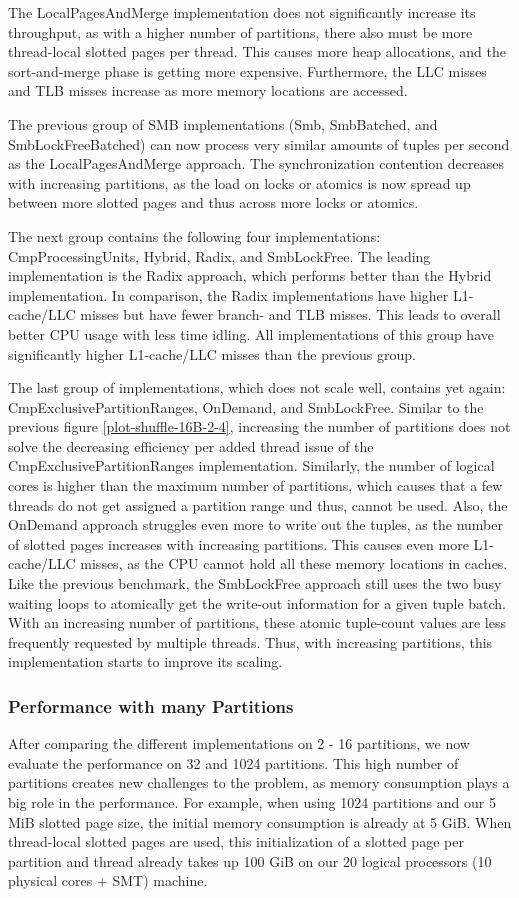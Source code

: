 The LocalPagesAndMerge implementation does not significantly increase its throughput, as with a higher number of partitions, there also must be more thread-local slotted pages per thread.
This causes more heap allocations, and the sort-and-merge phase is getting more expensive.
Furthermore, the \ac{LLC} misses and \ac{TLB} misses increase as more memory locations are accessed.

The previous group of SMB implementations (Smb, SmbBatched, and SmbLockFreeBatched) can now process very similar amounts of tuples per second as the LocalPagesAndMerge approach.
The synchronization contention decreases with increasing partitions, as the load on locks or atomics is now spread up between more slotted pages and thus across more locks or atomics.

The next group contains the following four implementations: CmpProcessingUnits, Hybrid, Radix, and SmbLockFree.
The leading implementation is the Radix approach, which performs better than the Hybrid implementation.
In comparison, the Radix implementations have higher L1-cache/LLC misses but have fewer branch- and TLB misses.
This leads to overall better CPU usage with less time idling.
All implementations of this group have significantly higher L1-cache/LLC misses than the previous group.

The last group of implementations, which does not scale well, contains yet again: CmpExclusivePartitionRanges, OnDemand, and SmbLockFree.
Similar to the previous figure \ref{plot-shuffle-16B-2-4}, increasing the number of partitions does not solve the decreasing efficiency per added thread issue of the CmpExclusivePartitionRanges implementation.
Similarly, the number of logical cores is higher than the maximum number of partitions, which causes that a few threads do not get assigned a partition range und thus, cannot be used.
Also, the OnDemand approach struggles even more to write out the tuples, as the number of slotted pages increases with increasing partitions.
This causes even more L1-cache/LLC misses, as the \ac{CPU} cannot hold all these memory locations in caches.
Like the previous benchmark, the SmbLockFree approach still uses the two busy waiting loops to atomically get the write-out information for a given tuple batch.
With an increasing number of partitions, these atomic tuple-count values are less frequently requested by multiple threads.
Thus, with increasing partitions, this implementation starts to improve its scaling.
\subsubsection{Performance with many Partitions}
After comparing the different implementations on 2 - 16 partitions, we now evaluate the performance on 32 and 1024 partitions.
This high number of partitions creates new challenges to the problem, as memory consumption plays a big role in the performance.
For example, when using 1024 partitions and our 5 MiB slotted page size, the initial memory consumption is already at 5 GiB.
When thread-local slotted pages are used, this initialization of a slotted page per partition and thread already takes up 100 GiB on our 20 logical processors (10 physical cores + SMT) machine.

